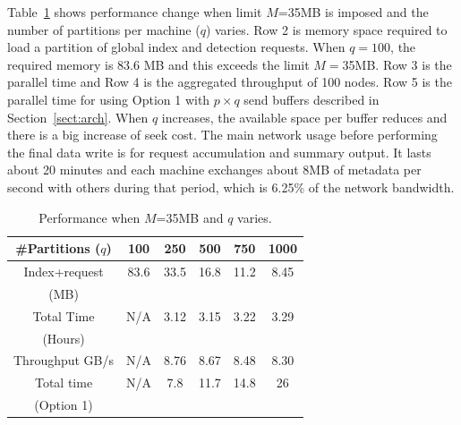 Table~\ref{tab:overall} shows performance change when limit $M$=35MB is imposed and
the number of partitions per machine ($q$) varies.
Row 2 is memory space required to load a partition of global index and detection requests.
When $q=100$, the required memory is 83.6 MB and this exceeds the limit $M=$35MB.  
Row 3 is the parallel time and Row 4 is  the aggregated throughput of  100 nodes.
Row 5 is  the parallel time for using Option 1 with $p\times q$ send buffers 
described in Section~\ref{sect:arch}. 
When $q$ increases, the available space per buffer reduces and there is a big increase of seek cost.  
The main network usage before performing the final data write is for request accumulation and
summary output. It lasts about 20 minutes and each machine exchanges 
about   8MB of metadata per second with others during that period, which is 6.25\% of the network bandwidth.

\begin{table}[hbt]
\caption{ Performance when $M$=35MB and $q$ varies.}
\begin{center}
\begin{tabular} {|c|c|c|c|c|c|}
\hline \#Partitions ($q$)  & 100 & 250  & 500 &  750 &  1000 \\
\hline Index+request & 83.6 &  33.5 & 16.8 & 11.2 & 8.45 \\
  (MB)           &  &   &  & &  \\

\hline Total Time  & N/A&  3.12 & 3.15 & 3.22 & 3.29 \\
  (Hours)           &  &   &  & &  \\
\hline Throughput GB/s& N/A&  8.76 & 8.67 & 8.48 & 8.30 \\
\hline Total time & N/A&  7.8& 11.7 & 14.8 & 26 \\
  (Option 1)           &  &   &  & &  \\
\hline
\end{tabular}
\end{center}
\label{tab:overall}
\end{table}

%

